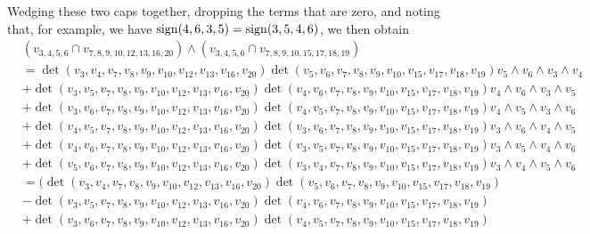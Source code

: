 \documentclass[ALCO, Unicode]{cedram}
\numberwithin{equation}{section}
\begin{document}
\begin{example}
Wedging these two caps together, dropping the terms that are zero, and noting that, for example, we have ${\rm sign}(4,6,3,5)={\rm sign}(3,5,4,6)$, we then obtain
{\tiny 
\begin{align*}
    &(v_{{3},{4},{5},{6}} \cap v_{7, 8, 9, 10, 12,13,16,{20}}) \wedge (v_{3,4,5,6} \cap v_{7,8,9,10, 15, 17, 18, 19})   \\
     &=\det\left(v_{3},v_{4}, v_{7}, v_{8}, v_{9}, v_{10}, v_{12}, v_{13}, v_{16}, v_{20}\right)  \det\left(v_{5},v_{6},v_7,v_8,v_9,v_{10},v_{15}, v_{17}, v_{18}, v_{19}\right) v_{5} \wedge v_{6} \wedge v_{3} \wedge v_{4}\nonumber \\
     &+ \det\left(v_{3},v_{5},v_{7}, v_{8}, v_{9}, v_{10}, v_{12}, v_{13}, v_{16}, v_{20}\right) \det\left(v_{4},v_{6},v_7,v_8,v_9,v_{10},v_{15}, v_{17}, v_{18}, v_{19}\right) v_{4} \wedge v_{6} \wedge v_{3} \wedge v_{5} \nonumber \\
     &+\det\left(v_{3},v_{6},v_{7}, v_{8}, v_{9}, v_{10}, v_{12}, v_{13}, v_{16}, v_{20}\right) \det\left(v_{4},v_{5},v_7,v_8,v_9,v_{10},v_{15}, v_{17}, v_{18}, v_{19}\right) v_{4} \wedge v_{5} \wedge v_{3} \wedge v_{6} \nonumber \\
     &+ \det\left(v_{4},v_{5},v_{7}, v_{8}, v_{9}, v_{10}, v_{12}, v_{13}, v_{16}, v_{20}\right) \det\left(v_{3},v_{6},v_7,v_8,v_9,v_{10},v_{15}, v_{17}, v_{18}, v_{19}\right) v_{3} \wedge v_{6} \wedge v_{4} \wedge v_{5} \nonumber \\
     &+ \det\left(v_{4},v_{6},v_{7}, v_{8}, v_{9}, v_{10}, v_{12}, v_{13}, v_{16}, v_{20}\right) \det\left(v_{3},v_{5},v_7,v_8,v_9,v_{10},v_{15}, v_{17}, v_{18}, v_{19}\right) v_{3} \wedge v_{5}\wedge v_{4} \wedge v_{6} \nonumber \\
     &+\det\left(v_{5},v_{6},v_{7}, v_{8}, v_{9}, v_{10}, v_{12}, v_{13}, v_{16}, v_{20}\right) \det\left(v_{3},v_{4},v_7,v_8,v_9,v_{10},v_{15}, v_{17}, v_{18}, v_{19}\right) v_{3} \wedge v_{4} \wedge v_{5} \wedge v_{6} \nonumber \\
     &= \Bigg( \det\left(v_{3},v_{4}, v_{7}, v_{8}, v_{9}, v_{10}, v_{12}, v_{13}, v_{16}, v_{20}\right)  \det\left(v_{5},v_{6},v_7,v_8,v_9,v_{10},v_{15}, v_{17}, v_{18}, v_{19}\right) \nonumber \\
     &- \det\left(v_{3},v_{5},v_{7}, v_{8}, v_{9}, v_{10}, v_{12}, v_{13}, v_{16}, v_{20}\right) \det\left(v_{4},v_{6},v_7,v_8,v_9,v_{10},v_{15}, v_{17}, v_{18}, v_{19}\right) \nonumber \\
     &+ \det\left(v_{3},v_{6},v_{7}, v_{8}, v_{9}, v_{10}, v_{12}, v_{13}, v_{16}, v_{20}\right) \det\left(v_{4},v_{5},v_7,v_8,v_9,v_{10},v_{15}, v_{17}, v_{18}, v_{19}\right) \nonumber \\

\end{align*}}
\end{example}
\end{document}
